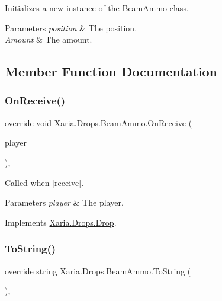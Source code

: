 Initializes a new instance of the \hyperlink{classXaria_1_1Drops_1_1BeamAmmo}{Beam\+Ammo} class. 


\begin{DoxyParams}{Parameters}
{\em position} & The position.\\
\hline
{\em Amount} & The amount.\\
\hline
\end{DoxyParams}


\subsection{Member Function Documentation}
\mbox{\label{classXaria_1_1Drops_1_1BeamAmmo_aa7141e1cf73e97b303871d0db8576811}} 
\subsubsection{\texorpdfstring{On\+Receive()}{OnReceive()}}
{\footnotesize\ttfamily override void Xaria.\+Drops.\+Beam\+Ammo.\+On\+Receive (\begin{DoxyParamCaption}\item[{ref \hyperlink{classXaria_1_1Player}{Player}}]{player }\end{DoxyParamCaption})\hspace{0.3cm}{\ttfamily [inline]}, {\ttfamily [virtual]}}



Called when \mbox{[}receive\mbox{]}. 


\begin{DoxyParams}{Parameters}
{\em player} & The player.\\
\hline
\end{DoxyParams}


Implements \hyperlink{classXaria_1_1Drops_1_1Drop_abb5544bb56ff889f557888bd9e86f7cb}{Xaria.\+Drops.\+Drop}.

\mbox{\label{classXaria_1_1Drops_1_1BeamAmmo_ad368797dd8e08afff7189322eb29fefd}} 
\subsubsection{\texorpdfstring{To\+String()}{ToString()}}
{\footnotesize\ttfamily override string Xaria.\+Drops.\+Beam\+Ammo.\+To\+String (\begin{DoxyParamCaption}{ }\end{DoxyParamCaption})\hspace{0.3cm}{\ttfamily [inline]}, {\ttfamily [virtual]}}



